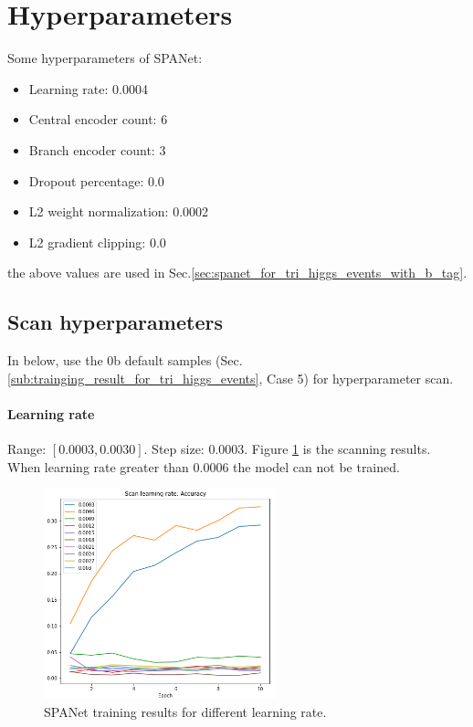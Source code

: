 \documentclass[12pt]{article}
\begin{document}
\section{Hyperparameters}%
\label{sec:hyperparameters}
	Some hyperparameters of SPANet:
	\begin{itemize}
		\item Learning rate: 0.0004
		\item Central encoder count: 6
		\item Branch encoder count: 3
		\item Dropout percentage: 0.0
		\item L2 weight normalization: 0.0002
		\item L2 gradient clipping: 0.0
	\end{itemize}
	the above values are used in Sec.\ref{sec:spanet_for_tri_higgs_events_with_b_tag}.
	\subsection{Scan hyperparameters}%
	\label{sub:scan_hyperparameters}
		In below, use the 0b default samples (Sec.\ref{sub:trainging_result_for_tri_higgs_events}, Case 5) for hyperparameter scan.

		\paragraph{Learning rate} Range: $[0.0003,  0.0030]$. Step size: $0.0003$. Figure \ref{fig:SPANet_scan_lr} is the scanning results. When learning rate greater than 0.0006 the model can not be trained.
		\begin{figure}[htpb]
			\centering
			\includegraphics[width=0.6\textwidth]{accuracy_curve_hp_scan_lr.png}
			\caption{SPANet training results for different learning rate.}
			\label{fig:SPANet_scan_lr}
		\end{figure}
\end{document}
